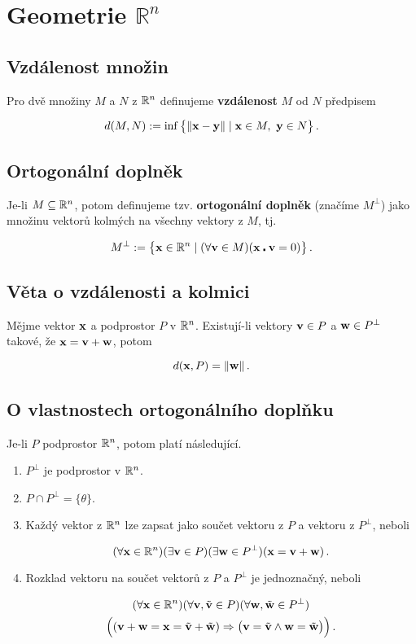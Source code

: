 \section{Geometrie $\mathbb{R}^n$}

\subsection*{Vzdálenost množin}

Pro dvě množiny $M$ a $N$ z $\mathbb{R}^n$ definujeme \textbf{vzdálenost} $M$ od $N$ předpisem

\[ d(M,N):=\inf \big\{\|\mathbf{x}-\mathbf{y}\|\mid \mathbf{x}\in M,\ \mathbf{y}\in N\big\}\,. \]

\subsection*{Ortogonální doplněk}

Je-li $M\subseteq \mathbb{R}^n$, potom definujeme tzv. \textbf{ortogonální doplněk} (značíme $M^\perp$) jako množinu vektorů kolmých na všechny vektory z $M$, tj.

\[ M^{\perp}:=\big\{\mathbf{x}\in \mathbb{R}^n\mid (\forall \mathbf{v}\in M)(\mathbf{x}\centerdot \mathbf{v}=0)\big\}\,. \]

\subsection*{Věta o vzdálenosti a kolmici}

Mějme vektor $\mathbf{x}$ a podprostor $P$ v $\mathbb{R}^n$. Existují-li vektory $\mathbf{v}\in P$ a $\mathbf{w}\in P^\perp$ takové, že $\mathbf{x}=\mathbf{v}+\mathbf{w}$, potom

\[ d(\mathbf{x},P)=\|\mathbf{w}\|\,. \]

\subsection*{O vlastnostech ortogonálního doplňku}

Je-li $P$ podprostor $\mathbb{R}^n$, potom platí následující.

\begin{enumerate}
	\item  $P^\perp$ je podprostor v $\mathbb{R}^n$.
	\item $P\cap P^\perp=\{\theta\}$.
	\item Každý vektor z $\mathbb{R}^n$ lze zapsat jako součet vektoru z $P$ a vektoru z $P^\perp$, neboli
	
	\[ (\forall \mathbf{x}\in \mathbb{R}^n)(\exists \mathbf{v}\in P)(\exists \mathbf{w}\in P^\perp)(\mathbf{x}=\mathbf{v}+\mathbf{w})\,. \]
	\item Rozklad vektoru na součet vektorů z $P$ a $P^\perp$ je jednoznačný, neboli
	
	\begin{gather*}
		(\forall \mathbf{x}\in \mathbb{R}^n)(\forall \mathbf{v},\tilde {\mathbf{v}} \in P)(\forall \mathbf{w}, \tilde {\mathbf{w}} \in P^\perp)\\
		\Big((\mathbf{v}+\mathbf{w}=\mathbf{x}=\tilde {\mathbf{v}}+\tilde {\mathbf{w}})\Rightarrow \big(\mathbf{v}=\tilde {\mathbf{v}} \wedge \mathbf{w}=\tilde {\mathbf{w}}\big)\Big)\,.
	\end{gather*}
	
\end{enumerate}

